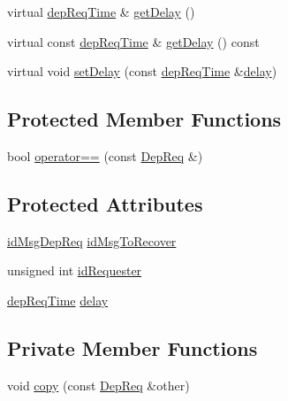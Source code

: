 \begin{DoxyCompactItemize}
\item 
virtual \hyperlink{dep_req__m_8h_ae16a4057335e3a89fda3f6019868733b}{dep\+Req\+Time} \& \hyperlink{class_dep_req_a42fa35b3ced2cd9a4afd0ddeade48c19}{get\+Delay} ()
\item 
virtual const \hyperlink{dep_req__m_8h_ae16a4057335e3a89fda3f6019868733b}{dep\+Req\+Time} \& \hyperlink{class_dep_req_a3f686e18997f1383d0670a271d45a37b}{get\+Delay} () const
\item 
virtual void \hyperlink{class_dep_req_a90ae52243ec735ebf15bdf3e8467b393}{set\+Delay} (const \hyperlink{dep_req__m_8h_ae16a4057335e3a89fda3f6019868733b}{dep\+Req\+Time} \&\hyperlink{class_dep_req_a5df5ddeac692e25c089b458faf51e0c9}{delay})
\end{DoxyCompactItemize}
\subsection*{Protected Member Functions}
\begin{DoxyCompactItemize}
\item 
bool \hyperlink{class_dep_req_a0426b6cf870f2751d0933d7a9d56134c}{operator==} (const \hyperlink{class_dep_req}{Dep\+Req} \&)
\end{DoxyCompactItemize}
\subsection*{Protected Attributes}
\begin{DoxyCompactItemize}
\item 
\hyperlink{dep_req__m_8h_a2bbb71ed0e9660ec02d81471eafd9c29}{id\+Msg\+Dep\+Req} \hyperlink{class_dep_req_a8547e169d4670212c0b612924dda94cc}{id\+Msg\+To\+Recover}
\item 
unsigned int \hyperlink{class_dep_req_a26936e95ef3fae4753d2442318646c6b}{id\+Requester}
\item 
\hyperlink{dep_req__m_8h_ae16a4057335e3a89fda3f6019868733b}{dep\+Req\+Time} \hyperlink{class_dep_req_a5df5ddeac692e25c089b458faf51e0c9}{delay}
\end{DoxyCompactItemize}
\subsection*{Private Member Functions}
\begin{DoxyCompactItemize}
\item 
void \hyperlink{class_dep_req_a3ec88f2216d73f6b499ae6653a60437b}{copy} (const \hyperlink{class_dep_req}{Dep\+Req} \&other)
\end{DoxyCompactItemize}


